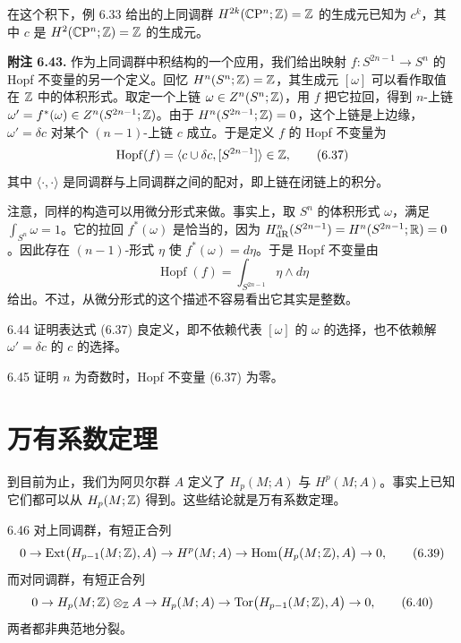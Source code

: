 在这个积下，例 6.33 给出的上同调群 $H^{2k}(\mathbb{C}\mathrm{P}^n;\mathbb{Z})=\mathbb{Z}$ 的生成元已知为 $c^k$，其中 $c$ 是 $H^2(\mathbb{C}\mathrm{P}^n;\mathbb{Z})=\mathbb{Z}$ 的生成元。

\textbf{附注 6.43.} 作为上同调群中积结构的一个应用，我们给出映射 $f:S^{2n-1}\to S^n$ 的 Hopf 不变量的另一个定义。回忆 $H^n(S^n;\mathbb{Z})=\mathbb{Z}$，其生成元 $[\omega]$ 可以看作取值在 $\mathbb{Z}$ 中的体积形式。取定一个上链 $\omega\in Z^n(S^n;\mathbb{Z})$，用 $f$ 把它拉回，得到 $n$-上链 $\omega'=f^*(\omega)\in Z^n(S^{2n-1};\mathbb{Z})$。由于 $H^n(S^{2n-1};\mathbb{Z})=0$，这个上链是上边缘，$\omega'=\delta c$ 对某个 $(n-1)$-上链 $c$ 成立。于是定义 $f$ 的 Hopf 不变量为
\begin{equation}
  \operatorname{Hopf}(f)=\langle c\cup\delta c,[S^{2n-1}]\rangle\in\mathbb{Z},
  \tag{6.37}
\end{equation}
其中 $\langle\cdot,\cdot\rangle$ 是同调群与上同调群之间的配对，即上链在闭链上的积分。

注意，同样的构造可以用微分形式来做。事实上，取 $S^n$ 的体积形式 $\omega$，满足 $\int_{S^n}\omega=1$。它的拉回 $f^*(\omega)$ 是恰当的，因为 $H^n_{\mathrm{dR}}(S^{2n-1})=H^n(S^{2n-1};\mathbb{R})=0$。因此存在 $(n-1)$-形式 $\eta$ 使 $f^*(\omega)=d\eta$。于是 Hopf 不变量由
\begin{equation}
  \operatorname{Hopf}(f)=\int_{S^{2n-1}}\eta\wedge d\eta
  \tag{6.38}
\end{equation}
给出。不过，从微分形式的这个描述不容易看出它其实是整数。\qedmark

\begin{question}{6.44}
  证明表达式 (6.37) 良定义，即不依赖代表 $[\omega]$ 的 $\omega$ 的选择，也不依赖解 $\omega'=\delta c$ 的 $c$ 的选择。
\end{question}

\begin{question}{6.45}
  证明 $n$ 为奇数时，Hopf 不变量 (6.37) 为零。
\end{question}



\section{万有系数定理}

到目前为止，我们为阿贝尔群 $A$ 定义了 $H_p(M;A)$ 与 $H^p(M;A)$。事实上已知它们都可以从 $H_p(M;\mathbb{Z})$ 得到。这些结论就是万有系数定理。

\begin{theorem}{6.46}
  对上同调群，有短正合列
  \begin{equation}
    0\to\operatorname{Ext}\bigl(H_{p-1}(M;\mathbb{Z}),A\bigr)\to H^p(M;A)
    \to\operatorname{Hom}\bigl(H_p(M;\mathbb{Z}),A\bigr)\to0,
    \tag{6.39}
  \end{equation}
  而对同调群，有短正合列
  \begin{equation}
    0\to H_p(M;\mathbb{Z})\otimes_{\mathbb{Z}} A\to H_p(M;A)
    \to\operatorname{Tor}\bigl(H_{p-1}(M;\mathbb{Z}),A\bigr)\to0,
    \tag{6.40}
  \end{equation}
  两者都非典范地分裂。
\end{theorem}


